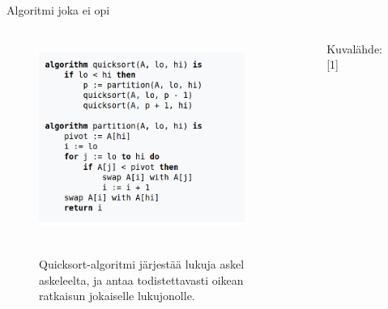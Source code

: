 \documentclass[presentation]{beamer}
\begin{document}
\begin{frame}{Algoritmi joka ei opi}
	\begin{columns}[]
			\centering
			\begin{figure}
				\includegraphics[width=\textwidth]{quicksort.png} \
				\caption*{Quicksort-algoritmi järjestää lukuja askel askeleelta, ja antaa todistettavasti oikean ratkaisun jokaiselle lukujonolle.}
			\end{figure}
		    \centering
		    \begin{figure}
		        \caption*{Kuvalähde:[1] }
		    \end{figure}
	\end{columns}
\end{frame}
\end{document}
